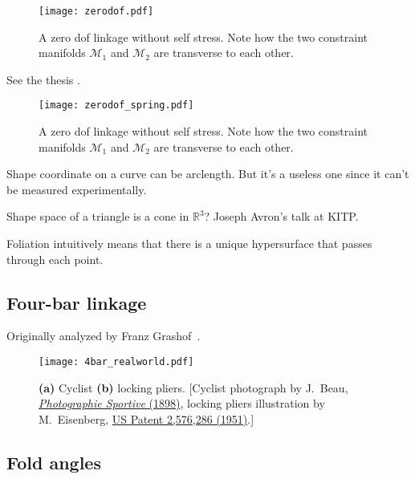 \begin{figure}
  \begin{center}
    \texttt{[image: zerodof.pdf]}
  \end{center}
\caption{A zero \ac{dof} linkage without self stress.  Note how the two constraint manifolds $\mathcal{M}_1$ and $\mathcal{M}_2$ are transverse to each other.}
  \label{fig:hello}
\end{figure}

See the thesis \cite{lengyel2002}.

\begin{figure}
  \begin{center}
    \texttt{[image: zerodof\_spring.pdf]}
  \end{center}
\caption[foo]{A zero \ac{dof} linkage without self stress.  Note how the two constraint manifolds $\mathcal{M}_1$ and $\mathcal{M}_2$ are transverse to each other.}
  \label{fig:hello2}
\end{figure}
\pagebreak

Shape coordinate on a curve can be arclength.  But it's a useless one since it can't be measured experimentally.

Shape space of a triangle is a cone in $\mathbb{R}^{3}$? Joseph Avron's talk at KITP.

Foliation intuitively means that there is a unique hypersurface that passes through each point.

\subsection{Four-bar linkage}

Originally analyzed by Franz Grashof~\cite[pp.~113--118]{grashof1883}.
%
\begin{figure}
  \begin{center}
    \texttt{[image: 4bar\_realworld.pdf]}
  \end{center}
\caption{\textbf{(a)} Cyclist \textbf{(b)} locking pliers.
  {\footnotesize [Cyclist photograph by J.~Beau, \href{https://gallica.bnf.fr/ark:/12148/btv1b8433328}{\emph{Photographie Sportive} (1898)}, locking pliers illustration by M.~Eisenberg, \href{https://patents.google.com/patent/US2576286A}{US Patent 2,576,286 (1951)}.]}
}
  \label{fig:4bar_realworld}
\end{figure}

\subsection{Fold angles}

